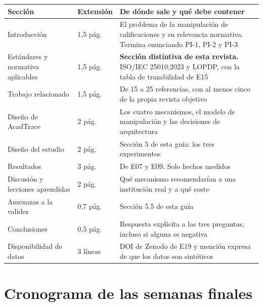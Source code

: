 \documentclass[11pt,a4paper]{article}
\begin{document}
\begin{center}
	\small
	\begin{tabular}{@{}p{3.8cm}p{1.7cm}p{9.3cm}@{}}
		\toprule
		\textbf{Sección} & \textbf{Extensión} & \textbf{De dónde sale y qué debe contener} \\
		\midrule
		Introducción & 1,5 pág. & El problema de la manipulación de calificaciones y su relevancia normativa. Termina enunciando PI-1, PI-2 y PI-3 \\
		\addlinespace
		Estándares y normativa aplicables & 1,5 pág. & \textbf{Sección distintiva de esta revista.} ISO/IEC 25010:2023 y LOPDP, con la tabla de trazabilidad de E15 \\
		\addlinespace
		Trabajo relacionado & 1,5 pág. & De 15 a 25 referencias, con al menos cinco de la propia revista objetivo \\
		\addlinespace
		Diseño de AcadTrace & 2 pág. & Los cuatro mecanismos, el modelo de manipulación y las decisiones de arquitectura \\
		\addlinespace
		Diseño del estudio & 2 pág. & Sección 5 de esta guía: los tres experimentos \\
		\addlinespace
		Resultados & 3 pág. & De E07 y E09. Solo hechos medidos \\
		\addlinespace
		Discusión y lecciones aprendidas & 2 pág. & Qué mecanismo recomendarían a una institución real y a qué coste \\
		\addlinespace
		Amenazas a la validez & 0,7 pág. & Sección 5.5 de esta guía \\
		\addlinespace
		Conclusiones & 0,5 pág. & Respuesta explícita a las tres preguntas, incluso si alguna es negativa \\
		\addlinespace
		Disponibilidad de datos & 3 líneas & DOI de Zenodo de E19 y mención expresa de que los datos son sintéticos \\
		\bottomrule
	\end{tabular}
\end{center}

\section{Cronograma de las semanas finales}
\end{document}
